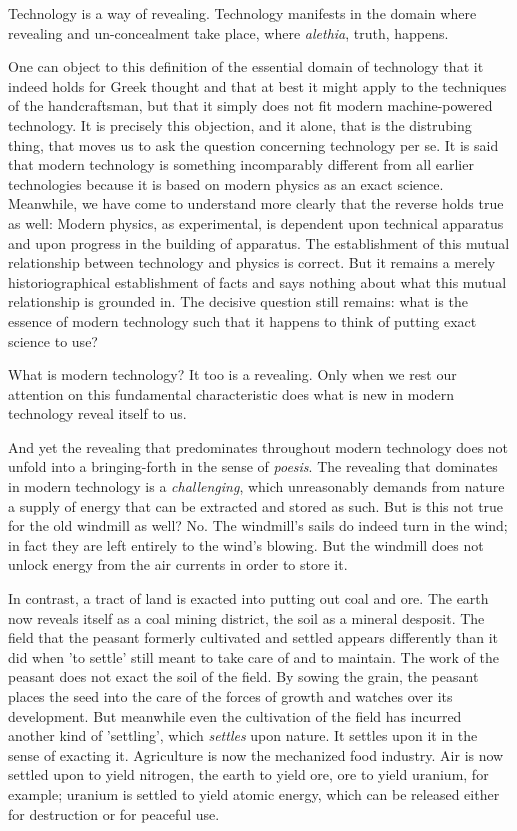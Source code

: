 \documentclass[12pt]{article}
\begin{document}
Technology is a way of revealing. Technology manifests in the domain where revealing and un-concealment take place, where \textit{al{\-e}thia}, truth, happens.

One can object to this definition of the essential domain of technology that it indeed holds for Greek thought and that at best it might apply to the techniques of the handcraftsman, but that it simply does not fit modern machine-powered technology. It is precisely this objection, and it alone, that is the distrubing thing, that moves us to ask the question concerning technology per se. It is said that modern technology is something incomparably different from all earlier technologies because it is based on modern physics as an exact science. Meanwhile, we have come to understand more clearly that the reverse holds true as well: Modern physics, as experimental, is dependent upon technical apparatus and upon progress in the building of apparatus. The establishment of this mutual relationship between technology and physics is correct. But it remains a merely historiographical establishment of facts and says nothing about what this mutual relationship is grounded in. The decisive question still remains: what is the essence of modern technology such that it happens to think of putting exact science to use?

What is modern technology? It too is a revealing. Only when we rest our attention on this fundamental characteristic does what is new in modern technology reveal itself to us. 

And yet the revealing that predominates throughout modern technology does not unfold into a bringing-forth in the sense of \textit{po{\-e}sis}. The revealing that dominates in modern technology is a \textit{challenging}, which unreasonably demands from nature a supply of energy that can be extracted and stored as such. But is this not true for the old windmill as well? No. The windmill's sails do indeed turn in the wind; in fact they are left entirely to the wind's blowing. But the windmill does not unlock energy from the air currents in order to store it.

In contrast, a tract of land is exacted into putting out coal and ore. The earth now reveals itself as a coal mining district, the soil as a mineral desposit. The field that the peasant formerly cultivated and settled appears differently than it did when 'to settle' still meant to take care of and to maintain. The work of the peasant does not exact the soil of the field. By sowing the grain, the peasant places the seed into the care of the forces of growth and watches over its development. But meanwhile even the cultivation of the field has incurred another kind of 'settling', which \textit{settles} upon nature. It settles upon it in the sense of exacting it. Agriculture is now the mechanized food industry. Air is now settled upon to yield nitrogen, the earth to yield ore, ore to yield uranium, for example; uranium is settled to yield atomic energy, which can be released either for destruction or for peaceful use.
\end{document}

